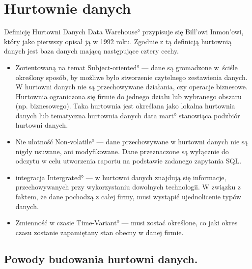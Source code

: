 \chapter{Hurtownie danych}


Definicję Hurtowni Danych \ang{Data Warehouse}  przypisuje się Bill'owi Inmon'owi,
 który jako pierwszy opisał ją w 1992 roku.
Zgodnie z tą definicją hurtownią danych jest baza danych mającą następujące cztery cechy. \cite{TodMan}

\begin{itemize}
 \item Zorientowaną na temat \ang{ Subject-oriented} --- 
    dane są gromadzone 
    w~ściśle określony sposób, by możliwe było stworzenie czytelnego zestawienia danych.
   W hurtowni danych nie są przechowywane działania,
    czy operacje biznesowe.
   Hurtownia ograniczona się firmie do jednego działu 
    lub wybranego obszaru (np. biznesowego).
   Taka hurtownia jest określana jako lokalna hurtownia danych 
    lub tematyczna hurtownia danych \ang{data mart} stanowiąca podzbiór hurtowni danych.
 \item Nie ulotność \ang{Non-volatile} --- 
    dane przechowywane w hurtowni danych nie są nigdy usuwane, ani modyfikowane. 
   Dane przeznaczone są wyłącznie do odczytu w celu utworzenia raportu na podstawie zadanego zapytania SQL.
 \item integracja \ang{Intergrated} --- 
    w hurtowni danych znajdują się informacje, 
    przechowywanych przy wykorzystaniu dowolnych technologii. 
    W związku z faktem, że dane pochodzą z całej firmy, musi wystąpić ujednolicenie typów danych.
 \item Zmienność w czasie \ang{Time-Variant} --- musi zostać określone,
  co jaki okres czasu zostanie zapamiętany stan obecny w danej firmie.

\end{itemize}


\section{Powody budowania hurtowni danych.}
  
